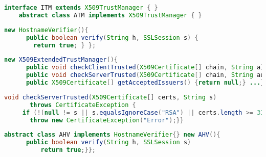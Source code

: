     \begin{lstlisting}[frame=tb,caption={\small Implementing an Interface with no overridden methods.}, label={lst:abstract_extension_empty},language=java]
    interface ITM extends X509TrustManager { }
    abstract class ATM implements X509TrustManager { }
    \end{lstlisting}
    \vspace{-0.25em}
    
    \begin{lstlisting}[frame=tb,caption={Inner class object from Abstract type ({\bf OP$_{12}$})}, label={lst:abstract_inner_class},language=java]
    new HostnameVerifier(){
      public boolean verify(String h, SSLSession s) {
        return true; } };
    \end{lstlisting}
    \vspace{-0.25em}
    
    
    \begin{lstlisting}[frame=tb,caption={\small Anonymous Inner Class Object of \texttt{X509ExtendedTrustManager} (\ref{flaw:X509ExtendedTrustManager})}, label={lst:aic_X509ExtendedTrustManager},language=java]
    new X509ExtendedTrustManager(){
      public void checkClientTrusted(X509Certificate[] chain, String a) throws CertificateException {}
      public void checkServerTrusted(X509Certificate[] chain, String authType)throws CertificateException {}
      public X509Certificate[] getAcceptedIssuers() {return null;} ...};
        \end{lstlisting}
        \vspace{-0.25em}
    
     \begin{lstlisting}[frame=tb,caption={\small Specific Condition in \inlinesmall{checkServerTrusted} method (\ref{flaw:X509TrustManagerSpecificConditions}) }, label={lst:specific_condition_trustmanager},language=java]
    void checkServerTrusted(X509Certificate[] certs, String s)
       throws CertificateException {
     if (!(null != s || s.equalsIgnoreCase("RSA") || certs.length >= 314)) {
       throw new CertificateException("Error");}}
        \end{lstlisting}
        \vspace{-0.25em}
    
    \begin{lstlisting}[frame=tb,caption={\small Anonymous Inner Class Object of An Empty Abstract Class that implements \hostnameVerifier}, label={lst:aic_empty_ext_abstract_hostname},language=java]
    abstract class AHV implements HostnameVerifier{} new AHV(){
      public boolean verify(String h, SSLSession s) 
          return true;}};
        \end{lstlisting}
        \vspace{-0.25em}
    

